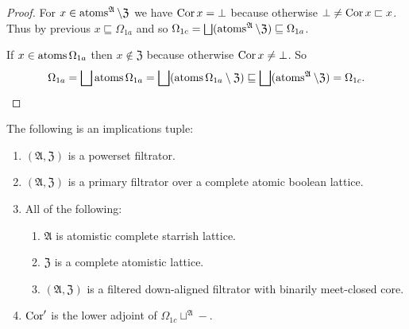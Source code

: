 \begin{proof}
For $x\in\operatorname{atoms}^{\mathfrak{A}}\setminus\mathfrak{Z}$ we have
$\operatorname{Cor} x=\bot$ because otherwise $\bot\ne\operatorname{Cor} x\sqsubset x$.
Thus by previous $x\sqsubseteq\Omega_{1a}$ and so
$\Omega_{1c} =
\bigsqcup(\atoms^{\mathfrak{A}}\setminus\mathfrak{Z}) \sqsubseteq
\Omega_{1a}$.

If $x\in\operatorname{atoms}\Omega_{1a}$ then $x\notin\mathfrak{Z}$ because otherwise
$\operatorname{Cor} x\ne\bot$. So \[ \Omega_{1a}=\bigsqcup\atoms \Omega_{1a}=
\bigsqcup(\atoms \Omega_{1a}\setminus\mathfrak{Z})\sqsubseteq
\bigsqcup(\atoms^{\mathfrak{A}}\setminus\mathfrak{Z}) =
\Omega_{1c}. \]
\end{proof}


\begin{thm}
The following is an implications tuple:
\begin{enumerate}
\item\label{cor-adj-omega-pow}
  $(\mathfrak{A},\mathfrak{Z})$ is a powerset filtrator.
\item\label{cor-adj-omega-cond}
  $(\mathfrak{A},\mathfrak{Z})$ is a primary filtrator over
  a complete atomic boolean lattice.
\item\label{cor-adj-omega-flt} All of the following:
  \begin{enumerate}
    \item $\mathfrak{A}$ is atomistic complete starrish lattice.
    \item $\mathfrak{Z}$ is a complete atomistic lattice.
    \item $(\mathfrak{A},\mathfrak{Z})$ is a filtered
      down-aligned filtrator with binarily meet-closed core.
  \end{enumerate}
\item\label{cor-adj-omega-res} $\operatorname{Cor}'$ is the lower adjoint of
  $\Omega_{1c}\sqcup^{\mathfrak{A}}-$.
\end{enumerate}
\end{thm}

